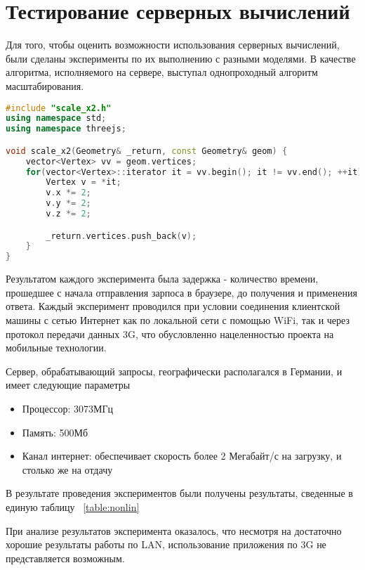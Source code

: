 \section{Тестирование серверных вычислений}

Для того, чтобы оценить возможности использования серверных вычислений, были
сделаны эксперименты по их выполнению с разными моделями. В качестве алгоритма,
исполняемого на сервере, выступал однопроходный алгоритм масштабирования.

\begin{lstlisting}[language=c++]
#include "scale_x2.h"
using namespace std;
using namespace threejs;

void scale_x2(Geometry& _return, const Geometry& geom) {
    vector<Vertex> vv = geom.vertices;
    for(vector<Vertex>::iterator it = vv.begin(); it != vv.end(); ++it) {
        Vertex v = *it;
        v.x *= 2;
        v.y *= 2;
        v.z *= 2;

        _return.vertices.push_back(v);
    }
}
\end{lstlisting}

Результатом каждого эксперимента была задержка - количество времени, прошедшее
с начала отправления зарпоса в браузере, до получения и применения ответа.
Каждый эксперимент проводился при условии соединения клиентской машины с сетью
Интернет как по локальной сети с помощью WiFi, так и через протокол передачи
данных 3G, что обусловленно нацеленностью проекта на мобильные технологии.

Сервер, обрабатывающий запросы, географически располагался в Германии, и имеет
следующие параметры
\begin{itemize}
    \item Процессор: 3073МГц
    \item Память: 500Мб
    \item Канал интернет: обеспечивает скорость более 2 Мегабайт/с на загрузку, и
    столько же на отдачу
\end{itemize}

В результате проведения экспериментов были получены результаты,
сведенные в единую таблицу ~\ref{table:nonlin}

\begin{table}[ht]
\begin{center}
\end{center}
\caption{Задержка серверных вычислений}
\label{table:nonlin}
\end{table}

При анализе результатов эксперимента оказалось, что несмотря на достаточно
хорошие результаты работы по LAN, использование приложения по 3G не
представляется возможным.
